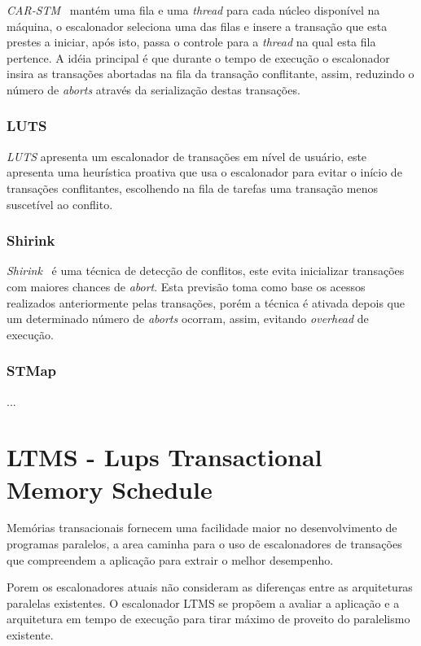 \documentclass[diss,capa]{texufpel}
\begin{document}
\emph{CAR-STM}~\cite{carstm2008} mantém uma fila e uma \emph{thread} para cada núcleo disponível na máquina, o escalonador seleciona uma das filas e insere a transação que esta prestes a iniciar, após isto, passa o controle para a \emph{thread} na qual esta fila pertence. A idéia principal é que durante o tempo de execução o escalonador insira as transações abortadas na fila da transação conflitante, assim, reduzindo o número de \emph{aborts} através da serialização destas transações.

\subsection{LUTS}

\emph{LUTS} apresenta um escalonador de transações em nível de usuário, este apresenta uma heurística proativa que usa o escalonador para evitar o início de transações conflitantes, escolhendo na fila de tarefas uma transação menos suscetível ao conflito.

\subsection{Shirink}

\emph{Shirink}~\cite{shirink2009} é uma técnica de detecção de conflitos, este evita inicializar transações com maiores chances de \emph{abort}. Esta previsão toma como base os acessos realizados anteriormente pelas transações, porém a técnica é ativada depois que um determinado número de \emph{aborts} ocorram, assim, evitando \emph{overhead} de execução.

\subsection{STMap}

...

\chapter{LTMS - Lups Transactional Memory Schedule}
\label{chapter::ltms}

Memórias transacionais fornecem uma facilidade maior no desenvolvimento de programas paralelos, a area caminha para o uso de escalonadores de transações que compreendem a aplicação para extrair o melhor desempenho.

Porem os escalonadores atuais não consideram as diferenças entre as arquiteturas paralelas existentes. O escalonador LTMS se propõem a avaliar a aplicação e a arquitetura em tempo de execução para tirar máximo de proveito do paralelismo existente.
\end{document}
